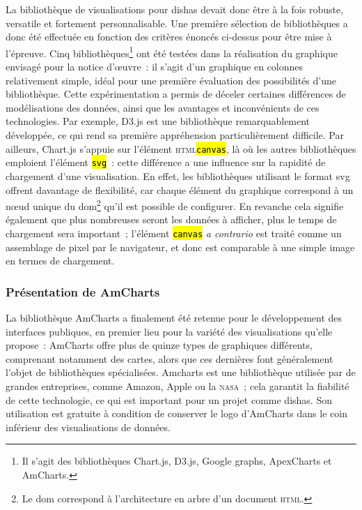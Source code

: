 \documentclass[a4paper,12pt,twoside]{book}
\let\OldTexttt\texttt
\renewcommand{\texttt}[1]{\OldTexttt{\hl{#1}}}
\newcommand{\eng}{\emph}
\newcommand{\html}{\textsc{html}\xspace}
\newcommand{\dishas}{\gls{dishas}\xspace}
\newcommand{\svg}{\gls{svg}\xspace}
\newcommand{\dom}{\gls{dom}\xspace}
\begin{document}
La bibliothèque de visualisations pour \dishas devait donc être à la fois robuste, versatile et fortement personnalisable. Une première sélection de bibliothèques a donc été effectuée en fonction des critères énoncés ci-dessus pour être mise à l'épreuve. Cinq bibliothèques\footnote{Il s'agit des bibliothèques Chart.js, D3.js, Google graphs, ApexCharts et AmCharts.} ont été testées dans la réalisation du graphique envisagé pour la notice d'œuvre~: il s'agit d'un graphique en colonnes relativement simple, idéal pour une première évaluation des possibilités d'une bibliothèque. Cette expérimentation a permis de déceler certaines différences de modélisations des données, ainsi que les avantages et inconvénients de ces technologies. Par exemple, D3.js est une bibliothèque remarquablement développée, ce qui rend sa première appréhension particulièrement difficile. Par ailleurs, Chart.js s'appuie sur l'élément \html \texttt{canvas}, là où les autres bibliothèques emploient l'élément \texttt{svg}~: cette différence a une influence sur la rapidité de chargement d'une visualisation. En effet, les bibliothèques utilisant le format \svg offrent davantage de flexibilité, car chaque élément du graphique correspond à un nœud unique du \dom\footnote{Le \dom correspond à l'architecture en arbre d'un document \html.} qu'il est possible de configurer. En revanche cela signifie également que plus nombreuses seront les données à afficher, plus le temps de chargement sera important~; l'élément \texttt{canvas} \eng{a contrario} est traité comme un assemblage de pixel par le navigateur, et donc est comparable à une simple image en termes de chargement.

			\subsubsection{Présentation de AmCharts}
La bibliothèque AmCharts a finalement été retenue pour le développement des interfaces publiques, en premier lieu pour la variété des visualisations qu'elle propose~: AmCharts offre plus de quinze types de graphiques différents, comprenant notamment des cartes, alors que ces dernières font généralement l'objet de bibliothèques spécialisées. Amcharts est une bibliothèque utilisée par de grandes entreprises, comme Amazon, Apple ou la \textsc{nasa}~; cela garantit la fiabilité de cette technologie, ce qui est important pour un projet comme \dishas. Son utilisation est gratuite à condition de conserver le logo d'AmCharts dans le coin inférieur des visualisations de données.
\end{document}
